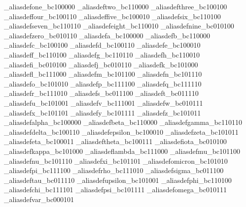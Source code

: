 \brl@char_aliasdef{one}{\brl@char_bc100000}
\brl@char_aliasdef{two}{\brl@char_bc110000}
\brl@char_aliasdef{three}{\brl@char_bc100100}
\brl@char_aliasdef{four}{\brl@char_bc100110}
\brl@char_aliasdef{five}{\brl@char_bc100010}
\brl@char_aliasdef{six}{\brl@char_bc110100}
\brl@char_aliasdef{seven}{\brl@char_bc110110}
\brl@char_aliasdef{eight}{\brl@char_bc110010}
\brl@char_aliasdef{nine}{\brl@char_bc010100}
\brl@char_aliasdef{zero}{\brl@char_bc010110}
\brl@char_aliasdef{a}{\brl@char_bc100000}
\brl@char_aliasdef{b}{\brl@char_bc110000}
\brl@char_aliasdef{c}{\brl@char_bc100100}
\brl@char_aliasdef{d}{\brl@char_bc100110}
\brl@char_aliasdef{e}{\brl@char_bc100010}
\brl@char_aliasdef{f}{\brl@char_bc110100}
\brl@char_aliasdef{g}{\brl@char_bc110110}
\brl@char_aliasdef{h}{\brl@char_bc110010}
\brl@char_aliasdef{i}{\brl@char_bc010100}
\brl@char_aliasdef{j}{\brl@char_bc010110}
\brl@char_aliasdef{k}{\brl@char_bc101000}
\brl@char_aliasdef{l}{\brl@char_bc111000}
\brl@char_aliasdef{m}{\brl@char_bc101100}
\brl@char_aliasdef{n}{\brl@char_bc101110}
\brl@char_aliasdef{o}{\brl@char_bc101010}
\brl@char_aliasdef{p}{\brl@char_bc111100}
\brl@char_aliasdef{q}{\brl@char_bc111110}
\brl@char_aliasdef{r}{\brl@char_bc111010}
\brl@char_aliasdef{s}{\brl@char_bc011100}
\brl@char_aliasdef{t}{\brl@char_bc011110}
\brl@char_aliasdef{u}{\brl@char_bc101001}
\brl@char_aliasdef{v}{\brl@char_bc111001}
\brl@char_aliasdef{w}{\brl@char_bc010111}
\brl@char_aliasdef{x}{\brl@char_bc101101}
\brl@char_aliasdef{y}{\brl@char_bc101111}
\brl@char_aliasdef{z}{\brl@char_bc101011}
\brl@char_aliasdef{alpha}{\brl@char_bc100000}
\brl@char_aliasdef{beta}{\brl@char_bc110000}
\brl@char_aliasdef{gamma}{\brl@char_bc110110}
\brl@char_aliasdef{delta}{\brl@char_bc100110}
\brl@char_aliasdef{epsilon}{\brl@char_bc100010}
\brl@char_aliasdef{zeta}{\brl@char_bc101011}
\brl@char_aliasdef{eta}{\brl@char_bc100011}
\brl@char_aliasdef{theta}{\brl@char_bc100111}
\brl@char_aliasdef{iota}{\brl@char_bc010100}
\brl@char_aliasdef{kappa}{\brl@char_bc101000}
\brl@char_aliasdef{lambda}{\brl@char_bc111000}
\brl@char_aliasdef{mu}{\brl@char_bc101100}
\brl@char_aliasdef{nu}{\brl@char_bc101110}
\brl@char_aliasdef{xi}{\brl@char_bc101101}
\brl@char_aliasdef{omicron}{\brl@char_bc101010}
\brl@char_aliasdef{pi}{\brl@char_bc111100}
\brl@char_aliasdef{rho}{\brl@char_bc111010}
\brl@char_aliasdef{sigma}{\brl@char_bc011100}
\brl@char_aliasdef{tau}{\brl@char_bc011110}
\brl@char_aliasdef{upsilon}{\brl@char_bc101001}
\brl@char_aliasdef{phi}{\brl@char_bc110100}
\brl@char_aliasdef{chi}{\brl@char_bc111101}
\brl@char_aliasdef{psi}{\brl@char_bc101111}
\brl@char_aliasdef{omega}{\brl@char_bc010111}
\brl@char_aliasdef{var}{\brl@char_bc000101}

